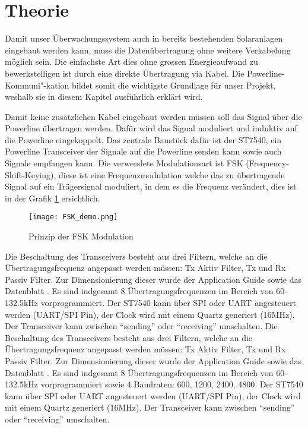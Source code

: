 \section{Theorie}

Damit unser Überwachungssystem auch in bereits bestehenden Solaranlagen eingebaut werden kann, muss die Datenübertragung ohne weitere Verkabelung möglich sein. Die einfachste Art dies ohne grossen Energieaufwand zu bewerkstelligen ist durch eine direkte Übertragung via Kabel. Die Powerline-Kommuni"-kation bildet somit die wichtigste Grundlage für unser Projekt, weshalb sie in diesem Kapitel ausführlich erklärt wird. 


Damit keine zusätzlichen Kabel eingebaut werden müssen soll das Signal über die Powerline übertragen werden. Dafür wird das Signal moduliert und induktiv auf die Powerline eingekoppelt. Das zentrale Baustück dafür ist der ST7540, ein Powerline Transceiver der Signale auf die Powerline senden kann sowie auch Signale empfangen kann. Die verwendete Modulationsart ist FSK (Frequency-Shift-Keying), diese ist eine Frequenzmodulation welche das zu übertragende Signal auf ein Trägersignal moduliert, in dem es die Frequenz verändert, dies ist in der Grafik \ref{fig::fskDemo} ersichtlich.

\begin{figure}[h]
\centering
\texttt{[image: FSK\_demo.png]}%
\caption{Prinzip der FSK Modulation \cite{fskDemo_wiki} }
\label{fig::fskDemo}
\end{figure}

Die Beschaltung des Transceivers besteht aus drei Filtern, welche an die Übertragungsfrequenz angepasst werden müssen: Tx Aktiv Filter, Tx und Rx Passiv Filter. Zur Dimensionierung dieser wurde der Application Guide \cite{Applic_Guide_ST7540} sowie das Datenblatt \cite{Datasheet_ST7540}. Es sind indgesamt 8 Übertragungsfrequenzen im Bereich von 60-132.5kHz vorprogrammiert. Der ST7540 kann über SPI oder UART angesteuert werden (UART/SPI Pin), der Clock wird mit einem Quartz generiert (16MHz). Der Transceiver kann zwischen ``sending'' oder ``receiving'' umschalten.
Die Beschaltung des Transceivers besteht aus drei Filtern, welche an die Übertragungsfrequenz angepasst werden müssen: Tx Aktiv Filter, Tx und Rx Passiv Filter. Zur Dimensionierung dieser wurde der Application Guide \cite{Applic_Guide_ST7540} sowie das Datenblatt \cite{Datasheet_ST7540}. Es sind indgesamt 8 Übertragungsfrequenzen im Bereich von 60-132.5kHz vorprogrammiert sowie 4 Baudraten: 600, 1200, 2400, 4800. Der ST7540 kann über SPI oder UART angesteuert werden (UART/SPI Pin), der Clock wird mit einem Quartz generiert (16MHz). Der Transceiver kann zwischen ``sending'' oder ``receiving'' umschalten.

